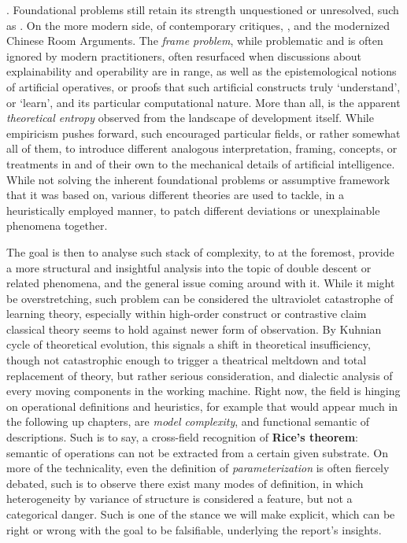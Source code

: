 . Foundational problems still retain its strength unquestioned or unresolved, such as \cite{dreyfus1965alchemy,dreyfus1972what,dreyfus1986mind,suchman1987plans,brooks1991intelligence,searle1980minds,mccarthy1969philosophical,harnad1990symbol}. On the more modern side, of contemporary critiques, \cite{pearl2009causality,marcus2018deep,sutton2019bitter}, and the modernized Chinese Room Arguments. The \textit{frame problem}, while problematic and is often ignored by modern practitioners, often resurfaced when discussions about explainability and operability are in range, as well as the epistemological notions of artificial operatives, or proofs that such artificial constructs truly `understand', or `learn', and its particular computational nature. More than all, is the apparent \textit{theoretical entropy} observed from the landscape of development itself. While empiricism pushes forward, such encouraged particular fields, or rather somewhat all of them, to introduce different analogous interpretation, framing, concepts, or treatments in and of their own to the mechanical details of artificial intelligence. While not solving the inherent foundational problems or assumptive framework that it was based on, various different theories are used to tackle, in a heuristically employed manner, to patch different deviations or unexplainable phenomena together. 

The goal is then to analyse such stack of complexity, to at the foremost, provide a more structural and insightful analysis into the topic of double descent or related phenomena, and the general issue coming around with it. While it might be overstretching, such problem can be considered the ultraviolet catastrophe of learning theory, especially within high-order construct or contrastive claim classical theory seems to hold against newer form of observation. By Kuhnian cycle of theoretical evolution, this signals a shift in theoretical insufficiency, though not catastrophic enough to trigger a theatrical meltdown and total replacement of theory, but rather serious consideration, and dialectic analysis of every moving components in the working machine. Right now, the field is hinging on operational definitions and heuristics, for example that would appear much in the following up chapters, are \textit{model complexity}, and functional semantic of descriptions. Such is to say, a cross-field recognition of \textbf{Rice's theorem}: semantic of operations can not be extracted from a certain given substrate. On more of the technicality, even the definition of \textit{parameterization} is often fiercely debated, such is to observe there exist many modes of definition, in which heterogeneity by variance of structure is considered a feature, but not a categorical danger. Such is one of the stance we will make explicit, which can be right or wrong with the goal to be falsifiable, underlying the report's insights. 

